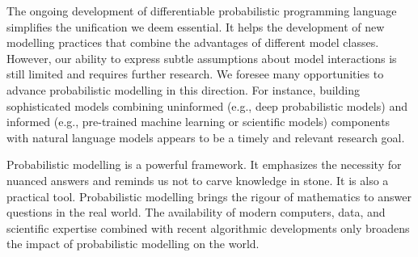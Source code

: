 The ongoing development of differentiable probabilistic programming language simplifies the unification we deem essential. It helps the development of new modelling practices that combine the advantages of different model classes. However, our ability to express subtle assumptions about model interactions is still limited and requires further research. We foresee many opportunities to advance probabilistic modelling in this direction. For instance, building sophisticated models combining uninformed (e.g., deep probabilistic models) and informed (e.g., pre-trained machine learning or scientific models) components with natural language models appears to be a timely and relevant research goal.

Probabilistic modelling is a powerful framework. It emphasizes the necessity for nuanced answers and reminds us not to carve knowledge in stone. It is also a practical tool. Probabilistic modelling brings the rigour of mathematics to answer questions in the real world. The availability of modern computers, data, and scientific expertise combined with recent algorithmic developments only broadens the impact of probabilistic modelling on the world.



%
%
%
%
%
%
%
%
%

